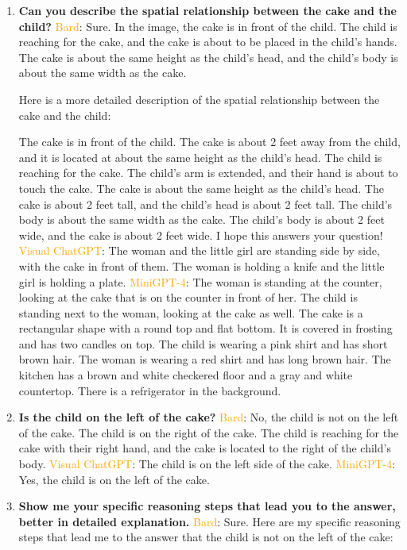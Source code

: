     \begin{enumerate}
        \item \textbf{Can you describe the spatial relationship between the cake and the child?}
        \subitem 
        \textcolor{orange}{Bard}:
        Sure. In the image, the cake is in front of the child. The child is reaching for the cake, and the cake is about to be placed in the child's hands. The cake is about the same height as the child's head, and the child's body is about the same width as the cake.

        Here is a more detailed description of the spatial relationship between the cake and the child:

        The cake is in front of the child. The cake is about 2 feet away from the child, and it is located at about the same height as the child's head.
        The child is reaching for the cake. The child's arm is extended, and their hand is about to touch the cake.
        The cake is about the same height as the child's head. The cake is about 2 feet tall, and the child's head is about 2 feet tall.
        The child's body is about the same width as the cake. The child's body is about 2 feet wide, and the cake is about 2 feet wide.
        I hope this answers your question!
        \subitem \textcolor{orange}{Visual ChatGPT}: The woman and the little girl are standing side by side, with the cake in front of them. The woman is holding a knife and the little girl is holding a plate.
        \subitem \textcolor{orange}{MiniGPT-4}: The woman is standing at the counter, looking at the cake that is on the counter in front of her. The child is standing next to the woman, looking at the cake as well. The cake is a rectangular shape with a round top and flat bottom. It is covered in frosting and has two candles on top. The child is wearing a pink shirt and has short brown hair. The woman is wearing a red shirt and has long brown hair. The kitchen has a brown and white checkered floor and a gray and white countertop. There is a refrigerator in the background.
        \item \textbf{Is the child on the left of the cake?}
        \subitem \textcolor{orange}{Bard}: No, the child is not on the left of the cake. The child is on the right of the cake. The child is reaching for the cake with their right hand, and the cake is located to the right of the child's body.
        \subitem \textcolor{orange}{Visual ChatGPT}: The child is on the left side of the cake.
        \subitem \textcolor{orange}{MiniGPT-4}: Yes, the child is on the left of the cake.
        \item \textbf{Show me your specific reasoning steps that lead you to the answer, better in detailed explanation.}
        \subitem \textcolor{orange}{Bard}:
        Sure. Here are my specific reasoning steps that lead me to the answer that the child is not on the left of the cake:


\end{enumerate}
